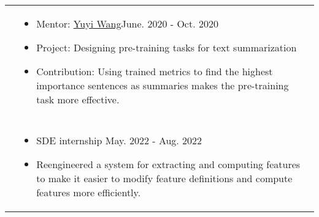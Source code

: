 \documentclass[letterpaper, 10pt]{article}
\begin{document}
\begin{longtable}{p{1.3in}p{4.8in}}
&  \begin{itemize}[leftmargin=10pt, itemsep=-5pt, topsep=0pt,before=\textbf{ETH Zürich}]
    \item Mentor: \href{https://disco.ethz.ch/alumni/yuwang}{Yuyi Wang}\hfill June. 2020 - Oct. 2020
    \item Project: Designing pre-training tasks for text summarization\hfill 
    \item Contribution: Using trained metrics to find the highest importance sentences as summaries makes the pre-training task more effective.
  \end{itemize}\\ 









& \\


{\color{black}{Industry Experience}} 

&  \begin{itemize}[leftmargin=10pt, itemsep=-5pt, topsep=0pt,before=\textbf{Lime}]
    \item SDE internship \hfill May. 2022 - Aug. 2022 
    \item Reengineered a system for extracting and computing features to make it easier to modify feature definitions and compute features more efficiently.
  \end{itemize}\\ 


\end{longtable}
\end{document}
